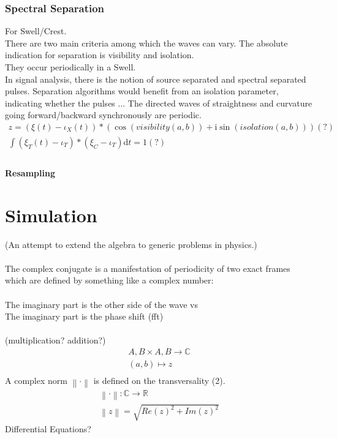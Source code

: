 \documentclass{report}
\newcommand\norm[1]{\left\lVert#1\right\rVert}
\begin{document}
\subsection{Spectral Separation}
For Swell/Crest.\\
There are two main criteria among which the waves can vary. The absolute indication for separation is visibility and isolation.\\
They occur periodically in a Swell.\\
In signal analysis, there is the notion of source separated and spectral separated pulses. Separation algorithms would benefit from an isolation parameter, indicating whether the pulses ...
The directed waves of straightness and curvature going forward/backward synchronously are periodic.
\begin{align}
z =  (\xi(t)-\iota_{X}(t))*(\cos{(visibility(a,b))} +\mathrm{i} \sin{(isolation(a,b))})(?)\\
\int \limits _{}^{} (\xi_{T}(t)-\iota_{T})*(\xi_{C}-\iota_{T})\mathrm{d}t=1(?)
\end{align}
\subsubsection{Resampling}

\chapter{Simulation}
(An attempt to extend the algebra to generic problems in physics.)\\\\
The complex conjugate is a manifestation of periodicity of two exact frames which are defined by something like a complex number:\\\\
The imaginary part is the other side of the wave vs\\
The imaginary part is the phase shift (fft)\\\\
(multiplication? addition?)
\begin{align}
A,B \times A,B \rightarrow \mathbb{C}\\
(a,b) \mapsto z\\
\end{align}
A complex norm $\norm{\cdot}$ is defined on the transversality (2).
\begin{align}
\norm{\cdot} : \mathbb{C} \rightarrow \mathbb{R}\\
\norm{z} = \sqrt{Re(z)^2+Im(z)^2}
\end{align}
Differential Equations?
\end{document}
